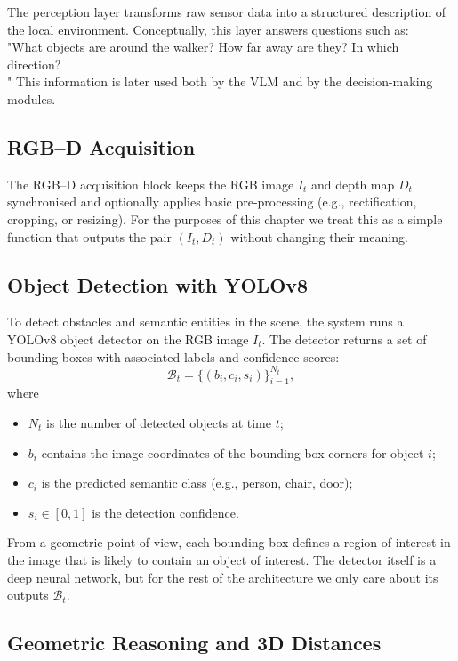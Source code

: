 \documentclass{article}
\begin{document}
The perception layer transforms raw sensor data into a structured description of the local environment. Conceptually, this layer answers questions such as: \\"What objects are around the walker? How far away are they? In which direction?\\" This information is later used both by the VLM and by the decision-making modules.

\subsection{RGB--D Acquisition}

The RGB--D acquisition block keeps the RGB image $I_t$ and depth map $D_t$ synchronised and optionally applies basic pre-processing (e.g., rectification, cropping, or resizing). For the purposes of this chapter we treat this as a simple function that outputs the pair $(I_t, D_t)$ without changing their meaning.

\subsection{Object Detection with YOLOv8}

To detect obstacles and semantic entities in the scene, the system runs a YOLOv8 object detector on the RGB image $I_t$. The detector returns a set of bounding boxes with associated labels and confidence scores:
\begin{equation}
    \mathcal{B}_t = \{ (b_i, c_i, s_i) \}_{i=1}^{N_t},
\end{equation}
where
\begin{itemize}
    \item $N_t$ is the number of detected objects at time $t$;
    \item $b_i$ contains the image coordinates of the bounding box corners for object $i$;
    \item $c_i$ is the predicted semantic class (e.g., person, chair, door);
    \item $s_i \in [0,1]$ is the detection confidence.
\end{itemize}

From a geometric point of view, each bounding box defines a region of interest in the image that is likely to contain an object of interest. The detector itself is a deep neural network, but for the rest of the architecture we only care about its outputs $\mathcal{B}_t$.

\subsection{Geometric Reasoning and 3D Distances}
\end{document}
